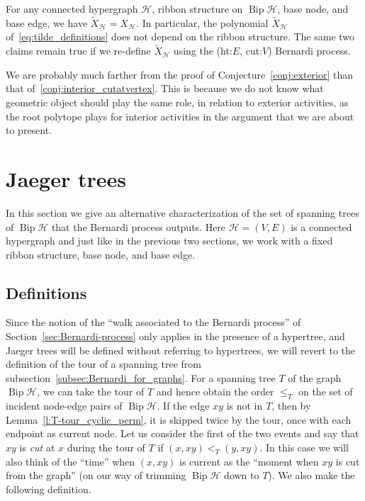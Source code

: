\documentclass[ALCO,ThmDefs,Unicode,epreuves]{cedram}
\newcommand{\HH}{\mathcal H}
\DeclareMathOperator{\bip}{Bip}
\DeclareMathOperator{\Bip}{Bip}
\begin{document}
\begin{conj}
\label{conj:exterior}
For any connected hypergraph $\HH$, ribbon structure on $\bip\HH$, base node, and base edge, we have $\tilde{X}_\HH=X_\HH$. In particular, the polynomial $\tilde{X}_{\HH}$ of~\eqref{eq:tilde_definitions} does not depend on the ribbon structure. The same two claims remain true if we re-define $\tilde{X}_\HH$ using the (ht:$E$, cut:$V$) Bernardi process.
\end{conj}

We are probably much farther from the proof of Conjecture~\ref{conj:exterior} than that of~\ref{conj:interior_cutatvertex}. This is because we do not know what geometric object should play the same role, in relation to exterior activities, as the root polytope plays for interior activities in the argument that we are about to present.



\section{Jaeger trees}
\label{sec:Jaeger_trees}

In this section we give an alternative characterization of the set of spanning trees of $\Bip \HH$ that the Bernardi process outputs. Here $\HH=(V,E)$ is a connected hypergraph and just like in the previous two sections, we work with a fixed ribbon structure, base node, and base edge.


\subsection{Definitions}

Since the notion of the ``walk associated to the Bernardi process'' of Section~\ref{sec:Bernardi-process} only applies in the presence of a hypertree, and Jaeger trees will be defined without referring to hypertrees, we will revert to the definition of the tour of a spanning tree from subsection~\ref{subsec:Bernardi_for_graphs}. For a spanning tree $T$ of the graph $\bip \HH$, we can take the tour of $T$ and hence obtain the order $\leq_T$ on the set of incident node-edge pairs of $\bip \HH$. If the edge $xy$ is not in $T$, then by Lemma~\ref{l:T-tour_cyclic_perm}, it is skipped twice by the tour, once with each endpoint as current node. Let us consider the first of the two events and say that $xy$ is \emph{cut} at $x$ during the tour of $T$ if $(x,xy)<_T (y,xy)$. In this case we will also think of the ``time'' when $(x,xy)$ is current as the ``moment when $xy$ is cut from the graph'' (on our way of trimming $\bip\HH$ down to $T$). We also make the following definition. 
\end{document}
